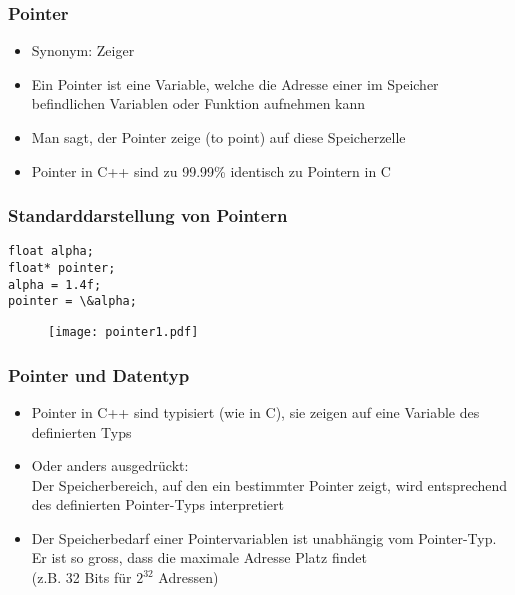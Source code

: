 \subsubsection{Pointer\hfill}
\label{sec:Pointer}
\begin{itemize}
	\item Synonym: Zeiger
	\item Ein Pointer ist eine Variable, welche die Adresse einer im Speicher befindlichen Variablen oder Funktion aufnehmen kann
	\item Man sagt, der Pointer zeige (to point) auf diese Speicherzelle
	\item Pointer in C++ sind zu 99.99\% identisch zu Pointern in C
\end{itemize}

\subsubsection{Standarddarstellung von Pointern\hfill}
\label{sec:Standarddarstellung von Pointern}
\noindent
\begin{minipage}{\linewidth}
\begin{lstlisting}
float alpha;
float* pointer;
alpha = 1.4f;
pointer = \&alpha;
 \end{lstlisting}
\end{minipage}
\begin{figure}[h]
	\centering
	\texttt{[image: pointer1.pdf]}
\end{figure}

\subsubsection{Pointer und Datentyp\hfill}
\label{sec:Pointer und Datentyp}
\begin{itemize}
	\item Pointer in C++ sind typisiert (wie in C), sie zeigen auf eine Variable des definierten Typs
	\item Oder anders ausgedrückt:
		\\ Der Speicherbereich, auf den ein bestimmter Pointer zeigt, wird entsprechend des definierten Pointer-Typs interpretiert
	\item Der Speicherbedarf einer Pointervariablen ist unabhängig vom Pointer-Typ. Er ist so gross, dass die maximale Adresse Platz findet
		\\ (z.B. 32 Bits für $2^{32}$ Adressen)
\end{itemize}

